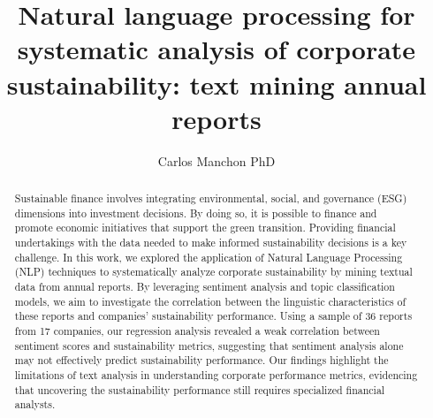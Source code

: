 \documentclass[times]{oupau}
\begin{document}
\runningheads{}{}

\title{Natural language processing for systematic analysis of corporate sustainability: text mining annual reports}


\author{Carlos Manchon PhD\corrauth}

\address{ClarityAI Europe, Spain\\}

\begin{abstract}

Sustainable finance involves integrating environmental, social, and governance (ESG) dimensions into investment decisions. By doing so, it is possible to finance and promote economic initiatives that support the green transition. Providing financial undertakings with the data needed to make informed sustainability decisions is a key challenge. In this work, we explored the application of Natural Language Processing (NLP) techniques to systematically analyze corporate sustainability by mining textual data from annual reports. By leveraging sentiment analysis and topic classification models, we aim to investigate the correlation between the linguistic characteristics of these reports and companies' sustainability performance. Using a sample of 36 reports from 17 companies, our regression analysis revealed a weak correlation between sentiment scores and sustainability metrics, suggesting that sentiment analysis alone may not effectively predict sustainability performance. 
Our findings highlight the limitations of text analysis in understanding corporate performance metrics, evidencing that uncovering the sustainability performance still requires specialized financial analysts.

\end{abstract}



\maketitle
\end{document}
